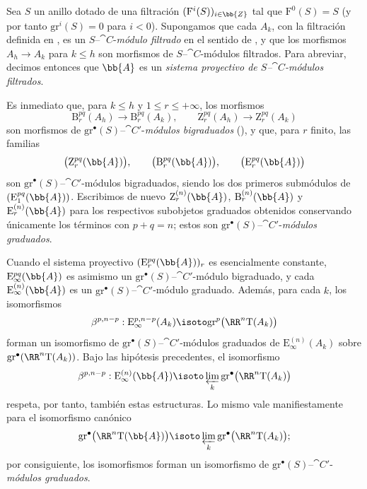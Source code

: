 \documentclass[oneside]{amsart}
\renewcommand{\leq}{\leqslant}
\let\EGAOriginalLabel\label
\renewcommand{\label}[1]{\phantomsection\EGAOriginalLabel{#1}}
\begin{document}
\begin{env}[13.7.6]
\label{0.13.7.6}
Sea $S$ un anillo dotado de una filtración
$(\mathrm{F}^i(S))_{i\in\bb{Z}}$ tal que
$\mathrm{F}^0(S)=S$ (y por tanto
$\mathrm{gr}^i(S)=0$ para $i<0$).
Supongamos que cada $A_k$, con la filtración definida en
, es un
$S$--$\cat{C}$-\emph{módulo filtrado} en el sentido de , y que los
morfismos $A_h\longrightarrow A_k$ para $k\leq h$ son morfismos de
$S$--$\cat{C}$-módulos filtrados.
Para abreviar, decimos entonces que $\bb{A}$ es un
\emph{sistema proyectivo de $S$--$\cat{C}$-módulos filtrados}.

Es inmediato que, para $k\leq h$ y
$1\leq r\leq+\infty$, los morfismos
\[
  \mathrm{B}_r^{pq}(A_h)\longrightarrow\mathrm{B}_r^{pq}(A_k),
  \qquad
  \mathrm{Z}_r^{pq}(A_h)\longrightarrow\mathrm{Z}_r^{pq}(A_k)
\]
son morfismos de
$\mathrm{gr}^\bullet(S)$--$\cat{C}'$-\emph{módulos bigraduados}
(), y que, para $r$ finito, las familias
\[
  \bigl(\mathrm{Z}_r^{pq}(\bb{A})\bigr),\qquad
  \bigl(\mathrm{B}_r^{pq}(\bb{A})\bigr),\qquad
  \bigl(\mathrm{E}_r^{pq}(\bb{A})\bigr)
\]
son $\mathrm{gr}^\bullet(S)$--$\cat{C}'$-módulos
bigraduados, siendo los dos primeros submódulos de
$(\mathrm{E}_1^{pq}(\bb{A}))$.
Escribimos de nuevo
$\mathrm{Z}_r^{(n)}(\bb{A})$,
$\mathrm{B}_r^{(n)}(\bb{A})$ y
$\mathrm{E}_r^{(n)}(\bb{A})$ para los respectivos subobjetos graduados
obtenidos conservando únicamente los términos con $p+q=n$; estos son
$\mathrm{gr}^\bullet(S)$--$\cat{C}'$-\emph{módulos graduados}.

Cuando el sistema proyectivo
$(\mathrm{E}_r^{pq}(\bb{A}))_r$ es esencialmente constante,
$\mathrm{E}_\infty^{pq}(\bb{A})$ es asimismo un
$\mathrm{gr}^\bullet(S)$--$\cat{C}'$-módulo bigraduado, y cada
$\mathrm{E}_\infty^{(n)}(\bb{A})$ es un
$\mathrm{gr}^\bullet(S)$--$\cat{C}'$-módulo graduado.
Además, para cada $k$, los isomorfismos
\[
  \beta^{p,n-p}:
  \mathrm{E}_\infty^{p,n-p}(A_k)
  \isoto
  \mathrm{gr}^p\bigl(\RR^n\mathrm{T}(A_k)\bigr)
\]
forman un isomorfismo de
$\mathrm{gr}^\bullet(S)$--$\cat{C}'$-módulos graduados de
$\mathrm{E}_\infty^{(n)}(A_k)$ sobre
$\mathrm{gr}^\bullet(\RR^n\mathrm{T}(A_k))$.
Bajo las hipótesis precedentes, el isomorfismo
\[
  \beta^{p,n-p}:
  \mathrm{E}_\infty^{(n)}(\bb{A})
  \isoto
  \varprojlim_k
  \mathrm{gr}^\bullet\bigl(\RR^n\mathrm{T}(A_k)\bigr)
\]
respeta, por tanto, también estas estructuras.
Lo mismo vale manifiestamente para el isomorfismo canónico
\[
  \mathrm{gr}^\bullet\bigl(\RR^n\mathrm{T}(\bb{A})\bigr)
  \isoto
  \varprojlim_k
  \mathrm{gr}^\bullet\bigl(\RR^n\mathrm{T}(A_k)\bigr);
\]
por consiguiente, los isomorfismos  forman un
isomorfismo de
$\mathrm{gr}^\bullet(S)$--$\cat{C}'$-\emph{módulos graduados}.
\end{env}
\end{document}
